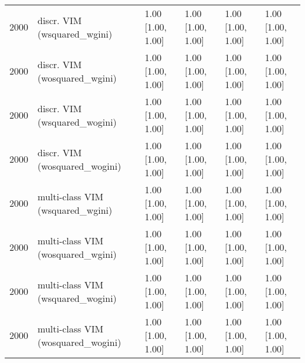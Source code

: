 \begin{table}[ht]
\begin{tabular}{rlllll}
  2000 & discr. VIM (wsquared\_wgini) & 1.00 [1.00, 1.00] & 1.00 [1.00, 1.00] & 1.00 [1.00, 1.00] & 1.00 [1.00, 1.00] \\ 
  2000 & discr. VIM (wosquared\_wgini) & 1.00 [1.00, 1.00] & 1.00 [1.00, 1.00] & 1.00 [1.00, 1.00] & 1.00 [1.00, 1.00] \\ 
  2000 & discr. VIM (wsquared\_wogini) & 1.00 [1.00, 1.00] & 1.00 [1.00, 1.00] & 1.00 [1.00, 1.00] & 1.00 [1.00, 1.00] \\ 
  2000 & discr. VIM (wosquared\_wogini) & 1.00 [1.00, 1.00] & 1.00 [1.00, 1.00] & 1.00 [1.00, 1.00] & 1.00 [1.00, 1.00] \\ 
  2000 & multi-class VIM (wsquared\_wgini) & 1.00 [1.00, 1.00] & 1.00 [1.00, 1.00] & 1.00 [1.00, 1.00] & 1.00 [1.00, 1.00] \\ 
  2000 & multi-class VIM (wosquared\_wgini) & 1.00 [1.00, 1.00] & 1.00 [1.00, 1.00] & 1.00 [1.00, 1.00] & 1.00 [1.00, 1.00] \\ 
  2000 & multi-class VIM (wsquared\_wogini) & 1.00 [1.00, 1.00] & 1.00 [1.00, 1.00] & 1.00 [1.00, 1.00] & 1.00 [1.00, 1.00] \\ 
  2000 & multi-class VIM (wosquared\_wogini) & 1.00 [1.00, 1.00] & 1.00 [1.00, 1.00] & 1.00 [1.00, 1.00] & 1.00 [1.00, 1.00] \\ 
   \hline
\end{tabular}
\end{table}
